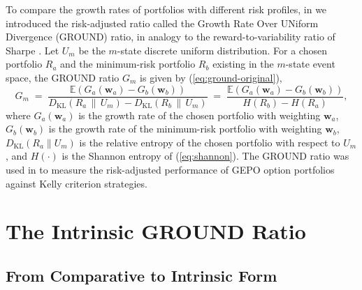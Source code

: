 \documentclass[11pt]{article}
\newcommand{\E}{\mathbb{E}}
\newcommand{\dkl}{D_{\mathrm{KL}}}
\begin{document}
To compare the growth rates of portfolios with different risk profiles, in
\cite{mercurio2020binary} we introduced the risk-adjusted ratio called the
Growth Rate Over UNiform Divergence (GROUND) ratio, in analogy to the
reward-to-variability ratio of Sharpe \cite{sharpe1966}. Let $U_m$ be the
$m$-state discrete uniform distribution. For a chosen portfolio $R_a$ and the
minimum-risk portfolio $R_b$ existing in the $m$-state event space, the GROUND
ratio $G_m$ is given by (\ref{eq:ground-original}),
\begin{equation}
G_m \;=\;
\frac{\E\!\left(G_a(\mathbf{w}_a) - G_b(\mathbf{w}_b)\right)}
     {\dkl(R_a \,\|\, U_m) - \dkl(R_b \,\|\, U_m)}
\;=\;
\frac{\E\!\left(G_a(\mathbf{w}_a) - G_b(\mathbf{w}_b)\right)}
     {H(R_b) - H(R_a)},
\label{eq:ground-original}
\end{equation}
where $G_a(\mathbf{w}_a)$ is the growth rate of the chosen portfolio with
weighting $\mathbf{w}_a$, $G_b(\mathbf{w}_b)$ is the growth rate of the
minimum-risk portfolio with weighting $\mathbf{w}_b$, $\dkl(R_a \| U_m)$ is
the relative entropy of the chosen portfolio with respect to $U_m$, and
$H(\cdot)$ is the Shannon entropy of (\ref{eq:shannon}). The GROUND ratio was
used in \cite{mercurio2020gepo} to measure the risk-adjusted performance of
GEPO option portfolios against Kelly criterion strategies.

\section{The Intrinsic GROUND Ratio}
\label{sec:intrinsic}
\label{sec:ground}

\subsection{From Comparative to Intrinsic Form}
\end{document}
